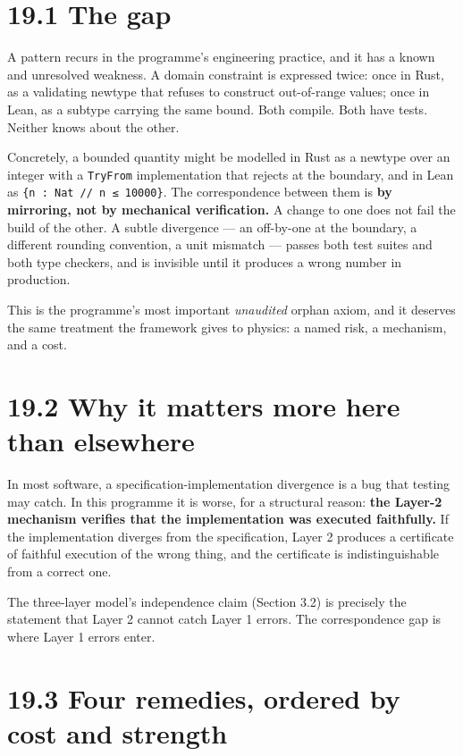 \documentclass[
  11pt]{report}
\begin{document}
\hypertarget{the-gap}{%
\section{19.1 The gap}\label{the-gap}}

A pattern recurs in the programme's engineering practice, and it has a
known and unresolved weakness. A domain constraint is expressed twice:
once in Rust, as a validating newtype that refuses to construct
out-of-range values; once in Lean, as a subtype carrying the same bound.
Both compile. Both have tests. Neither knows about the other.

Concretely, a bounded quantity might be modelled in Rust as a newtype
over an integer with a \texttt{TryFrom} implementation that rejects at
the boundary, and in Lean as \texttt{\{n\ :\ Nat\ //\ n\ ≤\ 10000\}}.
The correspondence between them is \textbf{by mirroring, not by
mechanical verification.} A change to one does not fail the build of the
other. A subtle divergence --- an off-by-one at the boundary, a
different rounding convention, a unit mismatch --- passes both test
suites and both type checkers, and is invisible until it produces a
wrong number in production.

This is the programme's most important \emph{unaudited} orphan axiom,
and it deserves the same treatment the framework gives to physics: a
named risk, a mechanism, and a cost.

\hypertarget{why-it-matters-more-here-than-elsewhere}{%
\section{19.2 Why it matters more here than
elsewhere}\label{why-it-matters-more-here-than-elsewhere}}

In most software, a specification-implementation divergence is a bug
that testing may catch. In this programme it is worse, for a structural
reason: \textbf{the Layer-2 mechanism verifies that the implementation
was executed faithfully.} If the implementation diverges from the
specification, Layer 2 produces a certificate of faithful execution of
the wrong thing, and the certificate is indistinguishable from a correct
one.

The three-layer model's independence claim (Section 3.2) is precisely
the statement that Layer 2 cannot catch Layer 1 errors. The
correspondence gap is where Layer 1 errors enter.

\hypertarget{four-remedies-ordered-by-cost-and-strength}{%
\section{19.3 Four remedies, ordered by cost and
strength}\label{four-remedies-ordered-by-cost-and-strength}}
\end{document}
